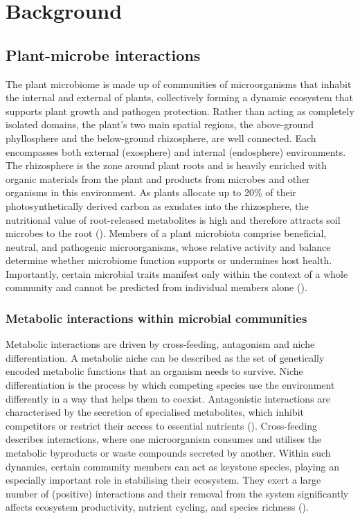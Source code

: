 \chapter{Background}
\section{Plant-microbe interactions}
The plant microbiome is made up of communities of microorganisms that inhabit the internal and external of plants, collectively forming a dynamic ecosystem that supports plant growth and pathogen protection. Rather than acting as completely isolated domains, the plant's two main spatial regions, the above-ground phyllosphere and the below-ground rhizosphere, are well connected. Each encompasses both external (exosphere) and internal (endosphere) environments. The rhizosphere is the zone around plant roots and is heavily enriched with organic materials from the plant and products from microbes and other organisms in this environment. 
As plants allocate up to 20\% of their photosynthetically derived carbon as exudates into the rhizosphere, the nutritional value of root-released metabolites is high and therefore attracts soil microbes to the root (\cite{trivedi_plantmicrobiome_2020, hutsch_plant_2002}).
Members of a plant microbiota comprise beneficial, neutral, and pathogenic microorganisms, whose relative activity and balance determine whether microbiome function supports or undermines host health. Importantly, certain microbial traits manifest only within the context of a whole community and cannot be predicted from individual members alone (\cite{trivedi_plantmicrobiome_2020}).
\subsection{Metabolic interactions within microbial communities}
Metabolic interactions are driven by cross-feeding, antagonism and niche differentiation. A metabolic niche can be described as the set of genetically encoded metabolic functions that an organism needs to survive. Niche differentiation is the process by which competing species use the environment differently in a way that helps them to coexist. Antagonistic interactions are characterised by the secretion of specialised metabolites, which inhibit competitors or restrict their access to essential nutrients (\cite{wankhade_review_2025}). Cross-feeding describes interactions, where one microorganism consumes and utilises the metabolic byproducts or waste compounds secreted by another. Within such dynamics, certain community members can act as keystone species, playing an especially important role in stabilising their ecosystem. They exert a large number of (positive) interactions and their removal from the system significantly affects ecosystem productivity, nutrient cycling, and species richness (\cite{amit_top-down_2023, banerjee_keystone_2018}).
